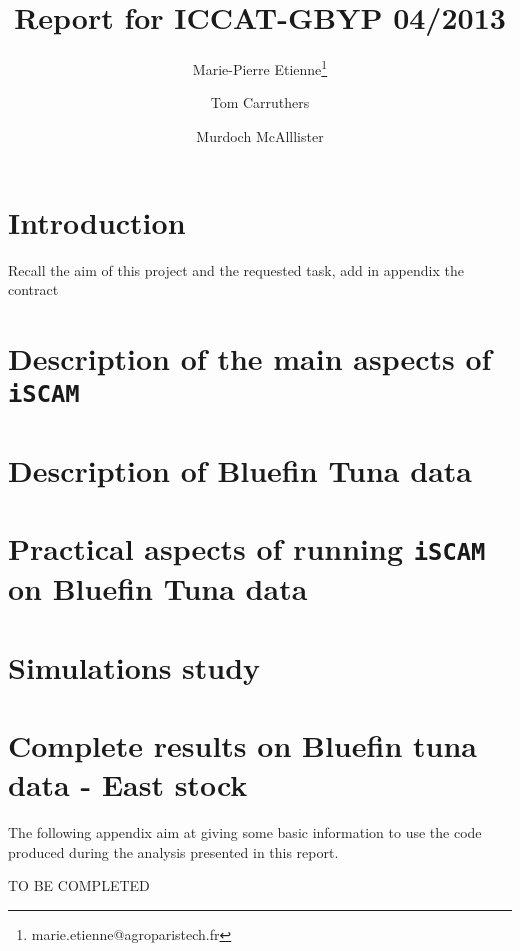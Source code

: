 \documentclass[a4paper]{article}\usepackage{graphicx, color}
\title{Report for ICCAT-GBYP 04/2013}
\author[1]{Marie-Pierre Etienne\thanks{marie.etienne@agroparistech.fr}}
\author[2]{Tom Carruthers }
\author[2]{Murdoch McAlllister}
\affil[1]{AgroParisTech}
\affil[2]{UBC}
\newcommand{\iscam}{\texttt{iSCAM }}
\begin{document}
\graphicspath{{/home/metienne/ICCAT/ICCAT-BFT/Report/figure}}
 






\maketitle
\tableofcontents

\section{Introduction}

Recall the aim of this project and the requested task, add in appendix
the contract

\section{Description of the main aspects of \iscam }


\section{Description of Bluefin Tuna data}


\section{Practical aspects of running \iscam on Bluefin Tuna data}


\section{Simulations study}
\label{sec:simulation}


\section{Complete results on Bluefin tuna data - East stock}
\label{sec:results}


\newpage
\appendix
The following appendix aim at giving some basic information to use the code produced during the analysis presented in this report.

TO BE COMPLETED


\end{document}
